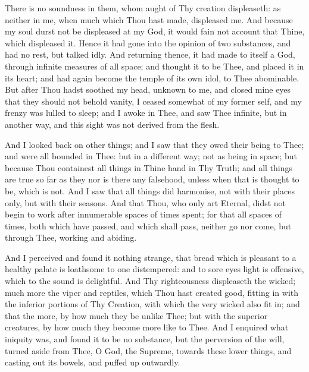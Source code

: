 \documentclass[b5paper,openright,12pt,twoside]{book}
\begin{document}
There is no soundness in them, whom aught of Thy creation displeaseth:
as neither in me, when much which Thou hast made, displeased me. And
because my soul durst not be displeased at my God, it would fain not
account that Thine, which displeased it. Hence it had gone into the
opinion of two substances, and had no rest, but talked idly. And
returning thence, it had made to itself a God, through infinite measures
of all space; and thought it to be Thee, and placed it in its heart;
and had again become the temple of its own idol, to Thee abominable. But
after Thou hadst soothed my head, unknown to me, and closed mine eyes
that they should not behold vanity, I ceased somewhat of my former self,
and my frenzy was lulled to sleep; and I awoke in Thee, and saw Thee
infinite, but in another way, and this sight was not derived from the
flesh.

And I looked back on other things; and I saw that they owed their being
to Thee; and were all bounded in Thee: but in a different way; not as
being in space; but because Thou containest all things in Thine hand
in Thy Truth; and all things are true so far as they nor is there any
falsehood, unless when that is thought to be, which is not. And I saw
that all things did harmonise, not with their places only, but with
their seasons. And that Thou, who only art Eternal, didst not begin to
work after innumerable spaces of times spent; for that all spaces of
times, both which have passed, and which shall pass, neither go nor
come, but through Thee, working and abiding.

And I perceived and found it nothing strange, that bread which is
pleasant to a healthy palate is loathsome to one distempered: and to
sore eyes light is offensive, which to the sound is delightful. And Thy
righteousness displeaseth the wicked; much more the viper and reptiles,
which Thou hast created good, fitting in with the inferior portions of
Thy Creation, with which the very wicked also fit in; and that the more,
by how much they be unlike Thee; but with the superior creatures, by how
much they become more like to Thee. And I enquired what iniquity was,
and found it to be no substance, but the perversion of the will, turned
aside from Thee, O God, the Supreme, towards these lower things, and
casting out its bowels, and puffed up outwardly.
\end{document}
